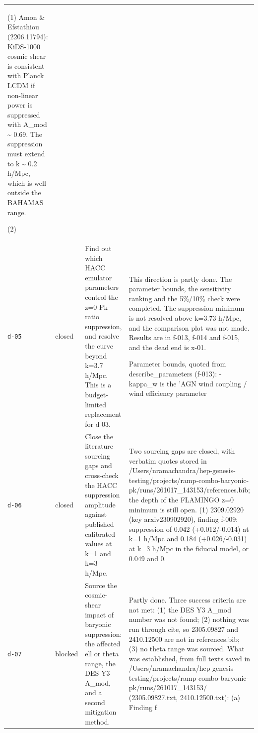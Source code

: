 \documentclass[11pt,a4paper]{article}
\begin{document}
\begin{longtable}{@{}p{}p{}p{}p{}@{}}
(1) Amon \& Efstathiou (2206.11794): KiDS-1000 cosmic shear is consistent with Planck LCDM if non-linear power is suppressed with A\_mod \textasciitilde{} 0.69. The suppression must extend to k \textasciitilde{} 0.2 h/Mpc, which is well outside the BAHAMAS range.

(2)  \\
\texttt{d-05} & closed & Find out which HACC emulator parameters control the z=0 Pk-ratio suppression, and resolve the curve beyond k=3.7 h/Mpc. This is a budget-limited replacement for d-03. & This direction is partly done. The parameter bounds, the sensitivity ranking and the 5\%/10\% check were completed. The suppression minimum is not resolved above k=3.73 h/Mpc, and the comparison plot was not made. Results are in f-013, f-014 and f-015, and the dead end is x-01.

Parameter bounds, quoted from describe\_parameters (f-013):
- kappa\_w is the 'AGN wind coupling / wind efficiency parameter \\
\texttt{d-06} & closed & Close the literature sourcing gaps and cross-check the HACC suppression amplitude against published calibrated values at k=1 and k=3 h/Mpc. & Two sourcing gaps are closed, with verbatim quotes stored in /Users/nramachandra/hep-genesis-testing/projects/ramp-combo-baryonic-pk/runs/261017\_143153/references.bib; the depth of the FLAMINGO z=0 minimum is still open. (1) 2309.02920 (key arxiv230902920), finding f-009: suppression of 0.042 (+0.012/-0.014) at k=1 h/Mpc and 0.184 (+0.026/-0.031) at k=3 h/Mpc in the fiducial model, or 0.049 and 0. \\
\texttt{d-07} & blocked & Source the cosmic-shear impact of baryonic suppression: the affected ell or theta range, the DES Y3 A\_mod, and a second mitigation method. & Partly done. Three success criteria are not met: (1) the DES Y3 A\_mod number was not found; (2) nothing was run through cite, so 2305.09827 and 2410.12500 are not in references.bib; (3) no theta range was sourced. What was established, from full texts saved in /Users/nramachandra/hep-genesis-testing/projects/ramp-combo-baryonic-pk/runs/261017\_143153/ (2305.09827.txt, 2410.12500.txt): (a) Finding f \\
\bottomrule\end{longtable}
\end{document}
